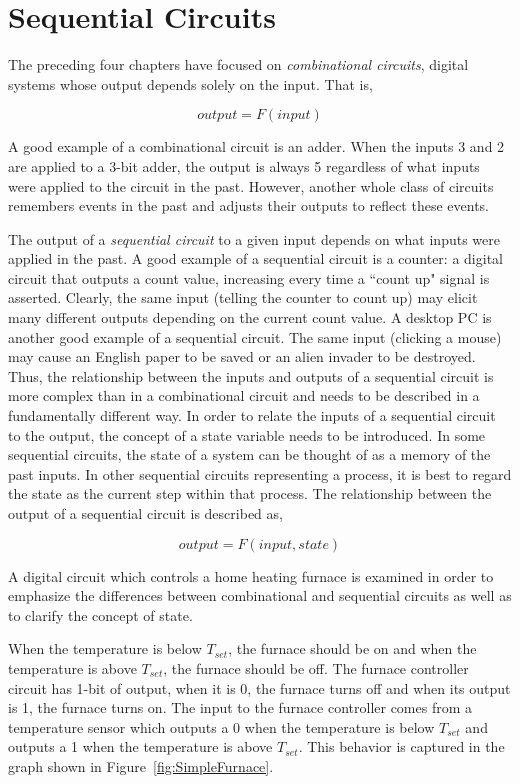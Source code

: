 \chapter{Sequential Circuits}
The preceding four chapters have focused on {\it combinational
circuits}, digital systems whose output depends solely on 
the input.  That is, 

$$output = F(input)$$

A good example of a combinational circuit is an adder.  When
the inputs 3 and 2 are applied to a 3-bit adder, the output 
is always 5 regardless of what inputs were applied to the 
circuit in the past. However, another whole class of 
circuits remembers events in the past and adjusts
their outputs to reflect these events.


The output of a {\it sequential circuit} to a given input
depends on what inputs were applied in the past.  A good 
example of a sequential circuit is a counter: a 
digital circuit that outputs a count value, increasing
every time a ``count up" signal is asserted.  Clearly, the 
same input (telling the counter to count up) may elicit 
many different outputs depending on the current count 
value.  A desktop PC is another good example of a 
sequential circuit.  The same input (clicking a mouse) may cause an
English paper to be saved or an alien invader to be destroyed.  Thus, the 
relationship between the inputs and outputs of a sequential circuit
is more complex than in a combinational circuit and needs 
to be described in a fundamentally different way. In order to relate 
the inputs of a sequential circuit to the output, the concept of a 
state variable needs to be introduced.  In some sequential circuits, the 
state of a system can be thought of as a memory of the past inputs.  
In other sequential circuits
representing a process, it is best to regard the state as the current 
step within that process.  The relationship between the output of 
a sequential circuit is described as,

$$output = F(input, state)$$

A digital circuit which  controls a home heating furnace is examined
in order  to emphasize the differences between combinational and 
sequential circuits as well as to clarify the concept of state.

When the temperature is below $T_{set}$, the furnace should be on 
and when the temperature is above $T_{set}$, the furnace should be 
off.  The furnace controller circuit has 1-bit of output, when 
it is 0, the furnace turns off and when its output is 1, the furnace turns on.  
The input to the furnace controller comes
from a temperature sensor which outputs a 0 when the temperature 
is below $T_{set}$ and outputs a 1 when the temperature 
is above $T_{set}$.  This behavior is captured in the graph shown 
in Figure~\ref{fig:SimpleFurnace}.

